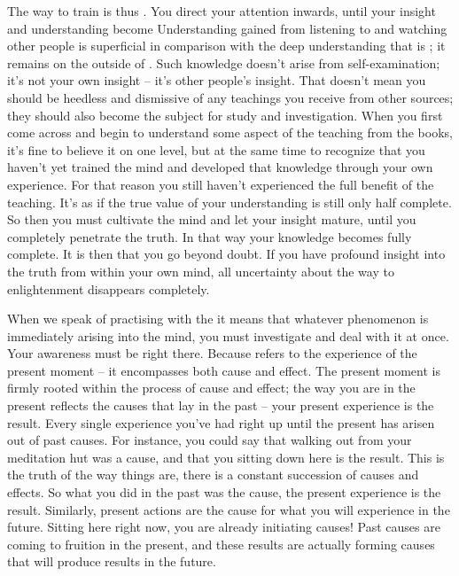 The way to train is thus . You direct your attention inwards, until your insight and understanding become  Understanding gained from listening to and watching other people is superficial in comparison with the deep understanding that is ; it remains on the outside of . Such knowledge doesn't arise from self-examination; it's not your own insight -- it's other people's insight. That doesn't mean you should be heedless and dismissive of any teachings you receive from other sources; they should also become the subject for study and investigation. When you first come across and begin to understand some aspect of the teaching from the books, it's fine to believe it on one level, but at the same time to recognize that you haven't yet trained the mind and developed that knowledge through your own experience. For that reason you still haven't experienced the full benefit of the teaching. It's as if the true value of your understanding is still only half complete. So then you must cultivate the mind and let your insight mature, until you completely penetrate the truth. In that way your knowledge becomes fully complete. It is then that you go beyond doubt. If you have profound insight into the truth from within your own mind, all uncertainty about the way to enlightenment disappears completely.

When we speak of practising with the  it means that whatever phenomenon is immediately arising into the mind, you must investigate and deal with it at once. Your awareness must be right there. Because  refers to the experience of the present moment -- it encompasses both cause and effect. The present moment is firmly rooted within the process of cause and effect; the way you are in the present reflects the causes that lay in the past -- your present experience is the result. Every single experience you've had right up until the present has arisen out of past causes. For instance, you could say that walking out from your meditation hut was a cause, and that you sitting down here is the result. This is the truth of the way things are, there is a constant succession of causes and effects. So what you did in the past was the cause, the present experience is the result. Similarly, present actions are the cause for what you will experience in the future. Sitting here right now, you are already initiating causes! Past causes are coming to fruition in the present, and these results are actually forming causes that will produce results in the future.

